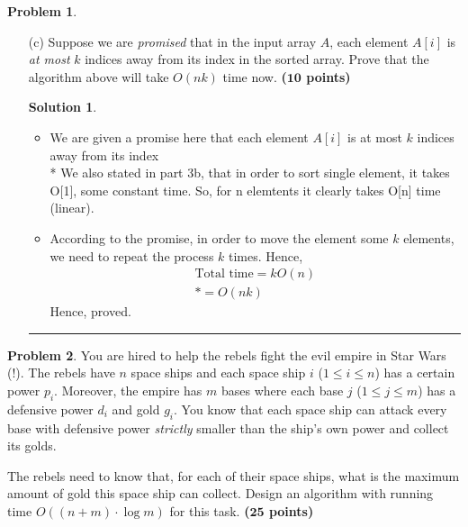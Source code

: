 \documentclass{article}
\theoremstyle{definition}
\newtheorem{problem}{Problem}
\def\fline{\rule{0.75\linewidth}{0.5pt}}
\newcommand{\finishline}{\begin{center}\fline\end{center}}
\newtheorem*{solution*}{Solution}
\newenvironment{solution}{\begin{solution*}}{{\finishline} \end{solution*}}
\newcommand{\grade}[1]{\hfill{\textbf{($\mathbf{#1}$ points)}}}
\begin{document}
\begin{problem}
\begin{enumerate}
	\item[(c)] Suppose we are \emph{promised} that in the input array $A$, each element $A[i]$ is \emph{at most} $k$ indices away from its index in the sorted array. Prove that
	the algorithm above will take $O(nk)$ time now.  \grade{10}
	
	\begin{solution}
\begin{itemize}
		\item We are given a promise here that each element $A[i]$ is at most $k$ indices away from its index \bigskip \\*
		We also stated in part 3b, that in order to sort single element, it takes O[1], some constant time. So, for n elemtents it clearly takes O[n] time (linear).
		\item According to the promise, in order to move the element some $k$ elements, we need to repeat the process $k$ times.
		Hence,
		\begin{align*}
			{\text{Total time}} = kO(n)\\*
			 = O(nk)
		\end{align*}
			Hence, proved.
	\end{itemize}
\end{solution}

	\end{enumerate}
\end{problem}

\begin{problem}
	You are hired to help the rebels fight the evil empire in Star Wars (!). The rebels have $n$ space ships and each space ship $i$ ($1 \leq i \leq n$) has a certain power $p_i$. Moreover, the empire has $m$ bases
	where each base $j$ ($1 \leq j \leq m$) has a defensive power $d_i$ and gold $g_i$. You know that each space ship can attack every base with defensive power \emph{strictly} smaller than the ship's own power and 
	collect its golds. 
	
	The rebels need to know that, for each of their space ships, what is the maximum amount of gold this space ship can collect. Design an algorithm with running time $O((n+m)\cdot\log{m})$ for this task. \grade{25}
\end{problem}
\end{document}

